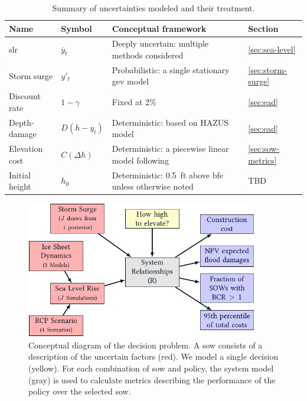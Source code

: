 \documentclass[12pt]{article}
\begin{document}
\begin{table}
    \centering
    \begin{tabular}{l l p{3in} l}
        \toprule
        Name           & Symbol           & Conceptual framework                                                                 & Section               \\
        \midrule
        \Gls{slr}      & $\overline{y}_t$ & Deeply uncertain: multiple methods considered                                        & \ref{sec:sea-level}   \\
        Storm surge    & $y'_t$           & Probabilistic: a single stationary \acrshort{gev} model                              & \ref{sec:storm-surge} \\
        Discount rate  & $1-\gamma$       & Fixed at 2\%                                                                         & \ref{sec:ead}         \\
        Depth-damage   & $D(h-y_t)$       & Deterministic: based on HAZUS model                                                  & \ref{sec:ead}         \\
        Elevation cost & $C(\Delta h)$    & Deterministic: a piecewise linear model following \citet{zarekarizi_suboptimal:2020} & \ref{sec:sow-metrics} \\
        Initial height & $h_0$            & Deterministic: \SI{0.5}{ft} above \gls{bfe} unless otherwise noted                   & TBD                   \\
        \bottomrule
    \end{tabular}
    \caption{Summary of uncertainties modeled and their treatment.}\label{tab:uncertainties}
\end{table}

\begin{figure}
    \centering
    \includegraphics[width=4in]{xlrm.pdf}
    \caption{
        Conceptual diagram of the decision problem.
        A \gls{sow} consists of a description of the uncertain factors (red).
        We model a single decision (yellow).
        For each combination of \gls{sow} and policy, the system model (gray) is used to calculate metrics describing the performance of the policy over the selected \gls{sow}.
    }\label{fig:xlrm}
\end{figure}
\end{document}
